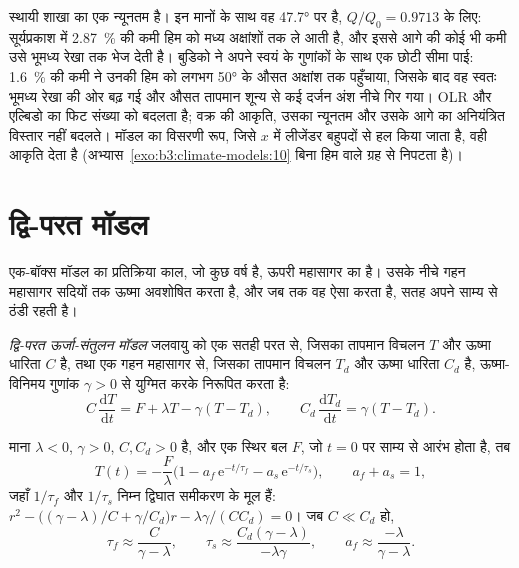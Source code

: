 
स्थायी शाखा का एक न्यूनतम है। इन मानों के साथ वह \ang{47.7} पर है,
$Q/Q_0 = \num{0.9713}$ के लिए: सूर्यप्रकाश में \qty{2.87}{\percent} की कमी
हिम को मध्य अक्षांशों तक ले आती है, और इससे आगे की कोई भी कमी उसे
भूमध्य रेखा तक भेज देती है। बुडिको ने अपने स्वयं के गुणांकों के साथ एक छोटी सीमा पाई:
\qty{1.6}{\percent} की कमी ने उनकी हिम को लगभग
\ang{50} के औसत अक्षांश तक पहुँचाया, जिसके बाद वह स्वतः भूमध्य रेखा की ओर बढ़ गई और
औसत तापमान शून्य से कई दर्जन अंश नीचे गिर गया। OLR और एल्बिडो का फिट
संख्या को बदलता है; वक्र की आकृति, उसका न्यूनतम और
उसके आगे का अनियंत्रित विस्तार नहीं बदलते। मॉडल का विसरणी रूप, जिसे
$x$ में लीजेंडर बहुपदों से हल किया जाता है, वही आकृति देता है (अभ्यास~\ref{exo:b3:climate-models:10}
बिना हिम वाले ग्रह से निपटता है)।

\section{द्वि-परत मॉडल}\label{sec:b3:climate-models:two-layer}

एक-बॉक्स मॉडल का प्रतिक्रिया काल, जो कुछ वर्ष है, ऊपरी
महासागर का है। उसके नीचे गहन महासागर सदियों तक ऊष्मा अवशोषित करता है,
और जब तक वह ऐसा करता है, सतह अपने साम्य से ठंडी रहती है।

\begin{definition}[द्वि-परत ऊर्जा-संतुलन मॉडल]\label{def:b3:climate-models:two-layer}
\emph{द्वि-परत ऊर्जा-संतुलन मॉडल} जलवायु को
एक सतही परत से, जिसका तापमान विचलन $T$
और ऊष्मा धारिता $C$ है, तथा एक गहन महासागर से, जिसका तापमान विचलन $T_d$ और
ऊष्मा धारिता $C_d$ है, ऊष्मा-विनिमय गुणांक $\gamma > 0$ से युग्मित करके निरूपित करता है:
\[
C\,\frac{\mathrm dT}{\mathrm dt} = F + \lambda T - \gamma(T - T_d), \qquad
C_d\,\frac{\mathrm dT_d}{\mathrm dt} = \gamma(T - T_d) .
\]
\end{definition}

\begin{theorem}[तीव्र और मंद अनुक्रियाएँ]\label{thm:b3:climate-models:two-layer}
माना $\lambda < 0$, $\gamma > 0$, $C, C_d > 0$ है, और एक स्थिर बल
$F$, जो $t = 0$ पर साम्य से आरंभ होता है, तब
\[
T(t) = -\frac{F}{\lambda}\Big(1 - a_f\,\mathrm e^{-t/\tau_f} - a_s\,\mathrm
e^{-t/\tau_s}\Big), \qquad a_f + a_s = 1 ,
\]
जहाँ $1/\tau_f$ और $1/\tau_s$ निम्न द्विघात समीकरण के मूल हैं: $r^2 - \big((\gamma -
\lambda)/C + \gamma/C_d\big)r - \lambda\gamma/(CC_d) = 0$। जब $C \ll C_d$ हो,
\[
\tau_f \approx \frac{C}{\gamma - \lambda}, \qquad
\tau_s \approx \frac{C_d(\gamma - \lambda)}{-\lambda\gamma}, \qquad
a_f \approx \frac{-\lambda}{\gamma - \lambda} .
\]
\end{theorem}

